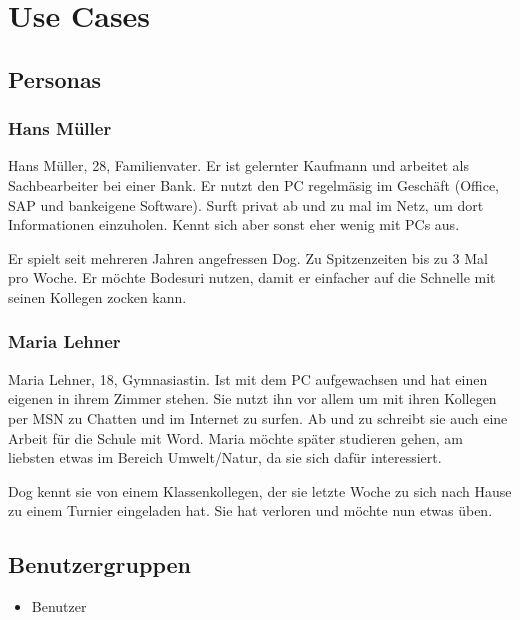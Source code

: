 \documentclass[a4paper,12pt,halfparskip,DIV14]{scrartcl}
\begin{document}



\section{Use Cases}

\subsection{Personas}\label{sec:personas} %
\subsubsection{Hans Müller}\label{sub:hans_müller} %
Hans Müller, 28, Familienvater. Er ist gelernter Kaufmann und arbeitet als Sachbearbeiter bei einer Bank. Er nutzt den PC regelmäsig im Geschäft (Office, SAP und bankeigene Software). Surft privat ab und zu mal im Netz, um dort Informationen einzuholen. Kennt sich aber sonst eher wenig mit PCs aus. 

Er spielt seit mehreren Jahren angefressen Dog. Zu Spitzenzeiten bis zu 3 Mal pro Woche. Er möchte Bodesuri nutzen, damit er einfacher auf die Schnelle mit seinen Kollegen zocken kann. 

\subsubsection{Maria Lehner}\label{sub:maria_lehner} %
Maria Lehner, 18, Gymnasiastin. Ist mit dem PC aufgewachsen und hat einen eigenen in ihrem Zimmer stehen. Sie nutzt ihn vor allem um mit ihren Kollegen per MSN zu Chatten und im Internet zu surfen. Ab und zu schreibt sie auch eine Arbeit für die Schule mit Word. Maria möchte später studieren gehen, am liebsten etwas im Bereich Umwelt/Natur, da sie sich dafür interessiert. 

Dog kennt sie von einem Klassenkollegen, der sie letzte Woche zu sich nach Hause zu einem Turnier eingeladen hat. Sie hat verloren und möchte nun etwas üben.

\subsection{Benutzergruppen}\label{sec:benutzergruppen} %
\begin{itemize}
	\item Benutzer
\end{itemize}
\end{document}
